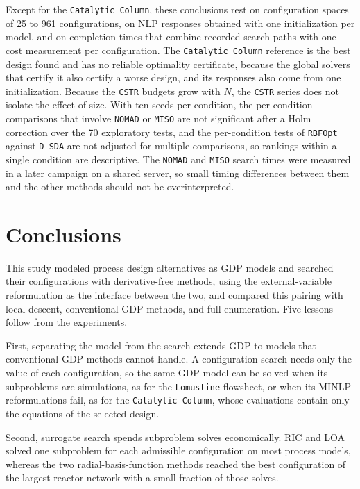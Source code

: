 \documentclass{article}
\begin{document}
Except for the \texttt{Catalytic Column}, these conclusions rest on configuration spaces of 25 to 961 configurations, on NLP responses obtained with one initialization per model, and on completion times that combine recorded search paths with one cost measurement per configuration.
The \texttt{Catalytic Column} reference is the best design found and has no reliable optimality certificate, because the global solvers that certify it also certify a worse design, and its responses also come from one initialization.
Because the \texttt{CSTR} budgets grow with \(N\), the \texttt{CSTR} series does not isolate the effect of size.
With ten seeds per condition, the per-condition comparisons that involve \texttt{NOMAD} or \texttt{MISO} are not significant after a Holm correction over the 70 exploratory tests, and the per-condition tests of \texttt{RBFOpt} against \texttt{D-SDA} are not adjusted for multiple comparisons, so rankings within a single condition are descriptive.
The \texttt{NOMAD} and \texttt{MISO} search times were measured in a later campaign on a shared server, so small timing differences between them and the other methods should not be overinterpreted.

\section{Conclusions}
This study modeled process design alternatives as GDP models and searched their configurations with derivative-free methods, using the external-variable reformulation as the interface between the two, and compared this pairing with local descent, conventional GDP methods, and full enumeration.
Five lessons follow from the experiments.

First, separating the model from the search extends GDP to models that conventional GDP methods cannot handle.
A configuration search needs only the value of each configuration, so the same GDP model can be solved when its subproblems are simulations, as for the \texttt{Lomustine} flowsheet, or when its MINLP reformulations fail, as for the \texttt{Catalytic Column}, whose evaluations contain only the equations of the selected design.

Second, surrogate search spends subproblem solves economically.
RIC and LOA solved one subproblem for each admissible configuration on most process models, whereas the two radial-basis-function methods reached the best configuration of the largest reactor network with a small fraction of those solves.
\end{document}
